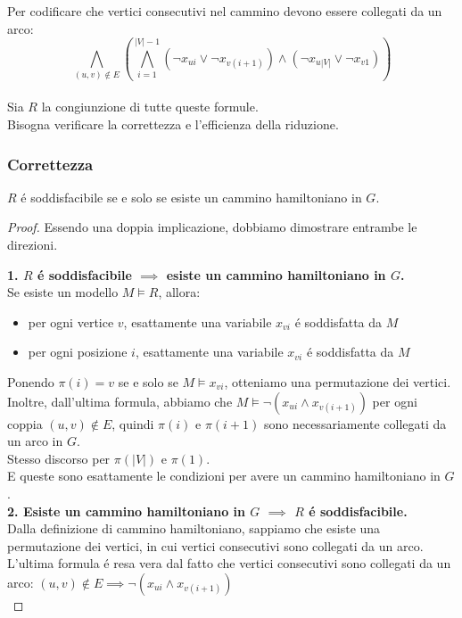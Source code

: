 Per codificare che vertici consecutivi nel cammino devono essere collegati da un arco:
\[
\bigwedge_{(u,v) \notin E} \left( \bigwedge_{i=1}^{|V|-1} (\neg x_{ui} \lor \neg x_{v(i+1)}) \land (\neg x_{u|V|} \lor \neg x_{v1}) \right)
\] \\

Sia $R$ la congiunzione di tutte queste formule. \\
Bisogna verificare la correttezza e l'efficienza della riduzione.
\subsubsection*{Correttezza}
$R$ é soddisfacibile se e solo se esiste un cammino hamiltoniano in $G$.
\begin{proof}
Essendo una doppia implicazione, dobbiamo dimostrare entrambe le direzioni.

\textbf{1. $R$ é soddisfacibile $\implies$ esiste un cammino hamiltoniano in $G$.} \\
Se esiste un modello $M \models R$, allora:
\begin{itemize}
    \item per ogni vertice $v$, esattamente una variabile $x_{vi}$ é soddisfatta da $M$
    \item per ogni posizione $i$, esattamente una variabile $x_{vi}$ é soddisfatta da $M$
\end{itemize}
Ponendo $\pi(i) = v$ se e solo se $M \models x_{vi}$, otteniamo una permutazione dei vertici. \\

Inoltre, dall'ultima formula, abbiamo che $M \models \neg (x_{ui} \land x_{v(i+1)})$ per ogni coppia $(u,v) \notin E$, 
quindi $\pi(i)$ e $\pi(i+1)$ sono necessariamente collegati da un arco in $G$. \\
Stesso discorso per $\pi(|V|)$ e $\pi(1)$. \\

E queste sono esattamente le condizioni per avere un cammino hamiltoniano in $G$. \\

\textbf{2. Esiste un cammino hamiltoniano in $G$ $\implies$ $R$ é soddisfacibile.} \\
Dalla definizione di cammino hamiltoniano, sappiamo che esiste una permutazione dei vertici, in cui vertici consecutivi sono collegati da un arco. \\

L'ultima formula é resa vera dal fatto che vertici consecutivi sono collegati da un arco:
$(u, v) \notin E \implies \neg (x_{ui} \land x_{v(i+1)})$ \\


\end{proof}
